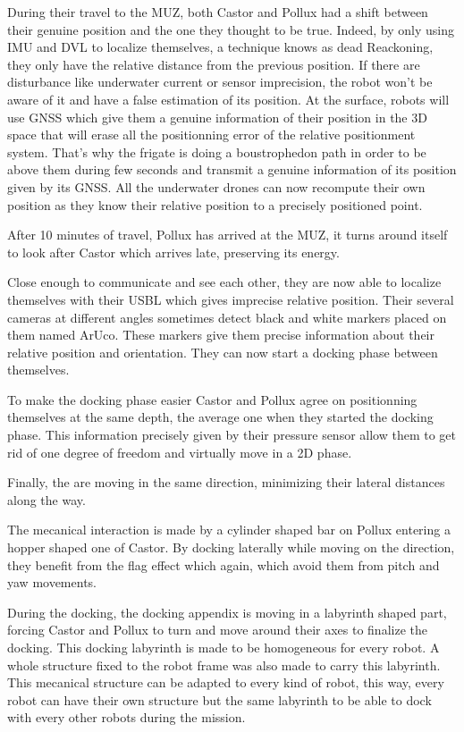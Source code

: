 \documentclass[twocolumn]{article}
\begin{document}
During their travel to the MUZ, both Castor and Pollux had a shift between their genuine position and the one they thought to be true. Indeed, by only using IMU and DVL to localize themselves, a technique knows as dead Reackoning, they only have the relative distance from the previous position. If there are disturbance like underwater current or sensor imprecision, the robot won't be aware of it and have a false estimation of its position. At the surface, robots will use GNSS which give them a genuine information of their position in the 3D space that will erase all the positionning error of the relative positionment system. That's why the frigate is doing a boustrophedon path in order to be above them during few seconds and transmit a genuine information of its position given by its GNSS. All the underwater drones can now recompute their own position as they know their relative position to a precisely positioned point.

After 10 minutes of travel, Pollux has arrived at the MUZ, it turns around itself to look after Castor which arrives late, preserving its energy.

Close enough to communicate and see each other, they are now able to localize themselves with their USBL which gives imprecise relative position. Their several cameras at different angles sometimes detect black and white markers placed on them named ArUco. These markers give them precise information about their relative position and orientation. They can now start a docking phase between themselves.

To make the docking phase easier Castor and Pollux agree on positionning themselves at the same depth, the average one when they started the docking phase. This information precisely given by their pressure sensor allow them to get rid of one degree of freedom and virtually move in a 2D phase.

Finally, the are moving in the same direction, minimizing their lateral distances along the way. 

The mecanical interaction is made by a cylinder shaped bar on Pollux entering a hopper shaped one of Castor. By docking laterally while moving on the direction, they benefit from the flag effect which again, which avoid them from pitch and yaw movements.

During the docking, the docking appendix is moving in a labyrinth shaped part, forcing Castor and Pollux to turn and move around their axes to finalize the docking. This docking labyrinth is made to be homogeneous for every robot. A whole structure fixed to the robot frame was also made to carry this labyrinth. This mecanical structure can be adapted to every kind of robot, this way, every robot can have their own structure but the same labyrinth to be able to dock with every other robots during the mission.
\end{document}
